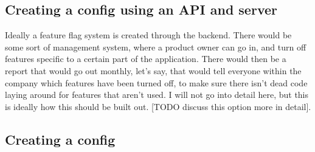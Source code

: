 \subsection{ Creating a config using an API and server }
Ideally a feature flag system is created through the backend. There would be
some sort of management system, where a product owner can go in, and turn off
features specific to a certain part of the application. There would then be a
report that would go out monthly, let's say, that would tell everyone within the
company which features have been turned off, to make sure there isn't dead code
laying around for features that aren't used. I will not go into detail here, but
this is ideally how this should be built out. [TODO discuss this option more in
detail].

\subsection{ Creating a config  }
